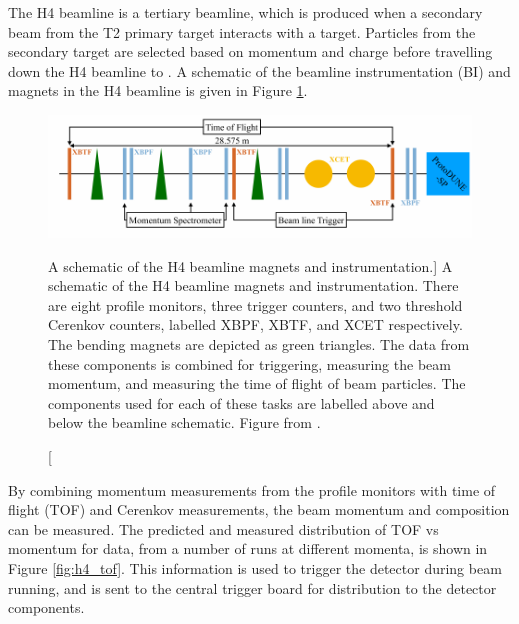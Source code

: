 The H4 beamline is a tertiary beamline, which is produced when a secondary beam
from the T2 primary target interacts with a target. Particles from the 
secondary target are selected based on momentum and charge before travelling 
down the H4 beamline to \protodune{}. A schematic of the beamline 
instrumentation (BI) and magnets in the H4 beamline is given in Figure 
\ref{fig:h4_schem}. 

\begin{figure}

	\centering

	\includegraphics[width=\textwidth]{figures/h4_schem.pdf}

	\caption
	[A schematic of the H4 beamline magnets and instrumentation.]
	{A schematic of the H4 beamline magnets and instrumentation. There are eight
	profile monitors, three trigger counters, and two threshold Cerenkov counters,
	labelled XBPF, XBTF, and XCET respectively. The bending magnets are depicted
	as green triangles. The data from these components is combined for triggering,
	measuring the beam momentum, and measuring the time of flight of beam
	particles. The components used for each of these tasks are labelled above and
	below the beamline schematic. Figure from \cite{protoduneperf}.}

	\label{fig:h4_schem}

\end{figure}

By combining momentum measurements from the profile monitors with time of flight
(TOF) and Cerenkov measurements, the beam momentum and composition can be 
measured. The predicted and measured distribution of TOF vs momentum for data,
from a number of runs at different momenta, is shown in Figure \ref{fig:h4_tof}.
This information is used to trigger the detector during beam running, and is
sent to the central trigger board for distribution to the detector components.

